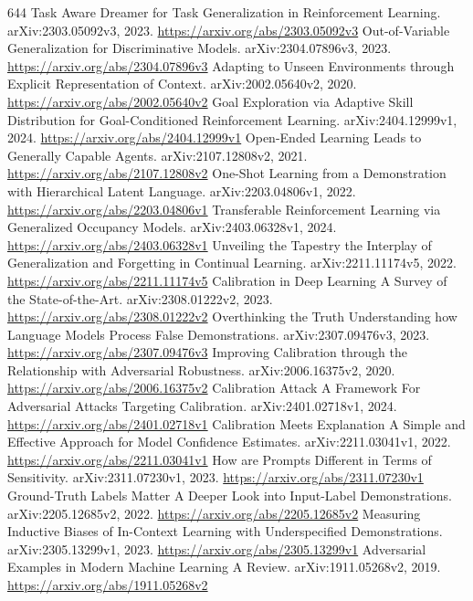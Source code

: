 \documentclass[11pt]{article}
\begin{document}
\begin{thebibliography}{644}
 Task Aware Dreamer for Task Generalization in Reinforcement Learning. arXiv:2303.05092v3, 2023. \url{https://arxiv.org/abs/2303.05092v3}
 Out-of-Variable Generalization for Discriminative Models. arXiv:2304.07896v3, 2023. \url{https://arxiv.org/abs/2304.07896v3}
 Adapting to Unseen Environments through Explicit Representation of Context. arXiv:2002.05640v2, 2020. \url{https://arxiv.org/abs/2002.05640v2}
 Goal Exploration via Adaptive Skill Distribution for Goal-Conditioned Reinforcement Learning. arXiv:2404.12999v1, 2024. \url{https://arxiv.org/abs/2404.12999v1}
 Open-Ended Learning Leads to Generally Capable Agents. arXiv:2107.12808v2, 2021. \url{https://arxiv.org/abs/2107.12808v2}
 One-Shot Learning from a Demonstration with Hierarchical Latent Language. arXiv:2203.04806v1, 2022. \url{https://arxiv.org/abs/2203.04806v1}
 Transferable Reinforcement Learning via Generalized Occupancy Models. arXiv:2403.06328v1, 2024. \url{https://arxiv.org/abs/2403.06328v1}
 Unveiling the Tapestry the Interplay of Generalization and Forgetting in Continual Learning. arXiv:2211.11174v5, 2022. \url{https://arxiv.org/abs/2211.11174v5}
 Calibration in Deep Learning A Survey of the State-of-the-Art. arXiv:2308.01222v2, 2023. \url{https://arxiv.org/abs/2308.01222v2}
 Overthinking the Truth Understanding how Language Models Process False Demonstrations. arXiv:2307.09476v3, 2023. \url{https://arxiv.org/abs/2307.09476v3}
 Improving Calibration through the Relationship with Adversarial Robustness. arXiv:2006.16375v2, 2020. \url{https://arxiv.org/abs/2006.16375v2}
 Calibration Attack A Framework For Adversarial Attacks Targeting Calibration. arXiv:2401.02718v1, 2024. \url{https://arxiv.org/abs/2401.02718v1}
 Calibration Meets Explanation A Simple and Effective Approach for Model Confidence Estimates. arXiv:2211.03041v1, 2022. \url{https://arxiv.org/abs/2211.03041v1}
 How are Prompts Different in Terms of Sensitivity. arXiv:2311.07230v1, 2023. \url{https://arxiv.org/abs/2311.07230v1}
 Ground-Truth Labels Matter A Deeper Look into Input-Label Demonstrations. arXiv:2205.12685v2, 2022. \url{https://arxiv.org/abs/2205.12685v2}
 Measuring Inductive Biases of In-Context Learning with Underspecified Demonstrations. arXiv:2305.13299v1, 2023. \url{https://arxiv.org/abs/2305.13299v1}
 Adversarial Examples in Modern Machine Learning A Review. arXiv:1911.05268v2, 2019. \url{https://arxiv.org/abs/1911.05268v2}

\end{thebibliography}
\end{document}
